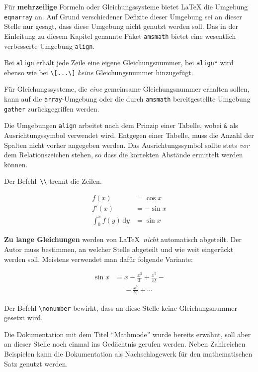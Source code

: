 Für \textbf{mehrzeilige} Formeln oder Gleichungssysteme bietet \LaTeX{} die
Umgebung \texttt{eqnarray} an. Auf Grund verschiedener Defizite dieser
Umgebung sei an dieser Stelle nur gesagt, dass diese Umgebung nicht genutzt
werden soll. Das in der Einleitung zu diesem Kapitel genannte Paket
\texttt{amsmath} bietet eine wesentlich verbesserte Umgebung \texttt{align}.



Bei \texttt{align} erhält jede Zeile eine eigene
Gleichungsnummer, bei \texttt{align*} wird ebenso wie bei
\lstinline|\[...\]| \emph{keine} Gleichungsnummer hinzugefügt.

Für Gleichungssysteme, die \emph{eine} gemeinsame Gleichungsnummer
erhalten sollen, kann auf die \texttt{array}-Umgebung oder die durch \texttt{amsmath}
bereitgestellte Umgebung \texttt{gather} zurückgegriffen werden.

Die Umgebungen \texttt{align} arbeitet nach dem Prinzip einer Tabelle, wobei \texttt{\&} als
Ausrichtungssymbol verwendet wird. Entgegen einer Tabelle, muss die Anzahl der Spalten nicht vorher 
angegeben werden. Das Ausrichtungssymbol sollte stets \emph{vor} dem Relationszeichen stehen, so
dass die korrekten Abstände ermittelt werden können. 

Der Befehl~\lstinline|\\| trennt die Zeilen.

\begin{LTXexample}
\begin{align}
f(x) & =  \cos x       \\
f'(x) & =  -\sin x     \\
\int_{0}^{x} f(y)\,\mathrm{d}y &
 =  \sin x
\end{align}
\end{LTXexample}


 
\textbf{Zu lange Gleichungen} werden von \LaTeX\ \textit{nicht}
automatisch abgeteilt.
Der Autor muss bestimmen, an welcher Stelle abgeteilt und wie
weit eingerückt werden soll.
Meistens verwendet man dafür folgende Variante:

\begin{LTXexample}
\begin{align}
\sin x & =  x -\frac{x^{3}}{3!}
     +\frac{x^{5}}{5!} - {} 
                    \nonumber\\
 &\mathrel{\phantom{=}} 
  -\frac{x^{7}}{7!} + \cdots
\end{align}
\end{LTXexample}

Der Befehl \lstinline|\nonumber| bewirkt, dass an diese Stelle keine
Gleichungsnummer gesetzt wird.

Die Dokumentation mit dem Titel \enquote{Mathmode} wurde bereits erwähnt, soll aber an dieser Stelle
noch einmal ins Gedächtnis gerufen werden. Neben Zahlreichen Beispielen kann
die Dokumentation als Nachschlagewerk für den mathematischen Satz genutzt werden.

\endinput
